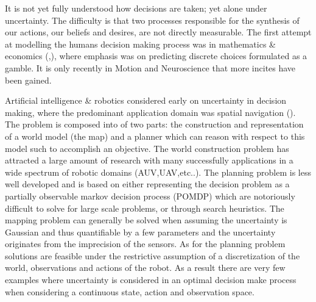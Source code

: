 It is not yet fully understood how decisions are taken; yet alone under uncertainty. The difficulty is that two processes responsible 
for the synthesis of our actions, our beliefs and desires, are not directly measurable. The first attempt at modelling the humans 
decision making process was in mathematics \& economics (\cite{Bernoulli1954},\cite{VonNeumann1944}), where emphasis was on 
predicting discrete choices formulated as a gamble. It is only recently in Motion and Neuroscience that more incites have 
been gained.




 
Artificial intelligence \& robotics considered early on uncertainty in decision making, 
where the predominant application domain was spatial navigation (\cite{ActingUncertainty_1996}). The problem is composed 
into of two parts: the construction and representation of a world model (the map) and a planner which can reason with 
respect to this model such to accomplish an objective. The world construction problem  has attracted a large amount of 
research with many successfully applications in a wide spectrum of robotic domains (AUV,UAV,etc..). The planning problem 
is less well developed and is based on either representing the decision problem as a partially observable markov decision 
process (POMDP) which are notoriously difficult to solve for large scale problems, or through search heuristics.  
The mapping problem can generally be solved when assuming the uncertainty is Gaussian and thus quantifiable 
by a few parameters and the uncertainty originates from the imprecision of the sensors. As for the planning problem solutions are feasible
under the restrictive assumption of a discretization of the world, observations and actions of the robot. As a result there are very
few examples where uncertainty is considered in an optimal decision make process when considering a continuous state, action 
and observation space.

